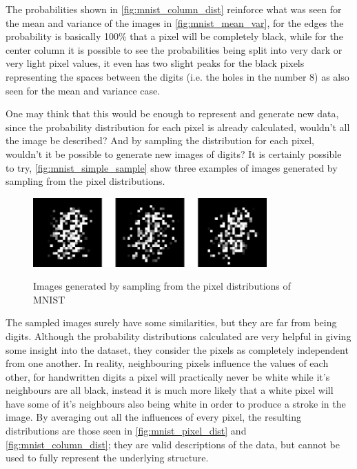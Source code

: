 The probabilities shown in \autoref{fig:mnist_column_dist} reinforce what was seen for the mean and variance of the images in \autoref{fig:mnist_mean_var}, for the edges the probability is basically 100\% that a pixel will be completely black, while for the center column it is possible to see the probabilities being split into very dark or very light pixel values, it even has two slight peaks for the black pixels representing the spaces between the digits (i.e. the holes in the number $8$) as also seen for the mean and variance case.

One may think that this would be enough to represent and generate new data, since the probability distribution for each pixel is already calculated, wouldn't all the image be described? And by sampling the distribution for each pixel, wouldn't it be possible to generate new images of digits? It is certainly possible to try, \autoref{fig:mnist_simple_sample} show three examples of images generated by sampling from the pixel distributions.
\begin{figure} [hbt]
    \centering
    \caption{Images generated by sampling from the pixel distributions of \gls{MNIST}}
    \includegraphics[width=0.8\textwidth]{chapters/GANs/figures/mnist_simple_samples.pdf}
    \label{fig:mnist_simple_sample}
\end{figure}

The sampled images surely have some similarities, but they are far from being digits. Although the probability distributions calculated are very helpful in giving some insight into the dataset, they consider the pixels as completely independent from one another. In reality, neighbouring pixels influence the values of each other, for handwritten digits a pixel will practically never be white while it's neighbours are all black, instead it is much more likely that a white pixel will have some of it's neighbours also being white in order to produce a stroke in the image. By averaging out all the influences of every pixel, the resulting distributions are those seen in \autoref{fig:mnist_pixel_dist} and \autoref{fig:mnist_column_dist}; they are valid descriptions of the data, but cannot be used to fully represent the underlying structure.

